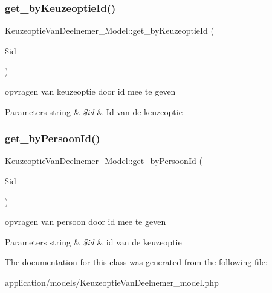 \subsubsection{\texorpdfstring{get\+\_\+by\+Keuzeoptie\+Id()}{get\_byKeuzeoptieId()}}
{\footnotesize\ttfamily Keuzeoptie\+Van\+Deelnemer\+\_\+\+Model\+::get\+\_\+by\+Keuzeoptie\+Id (\begin{DoxyParamCaption}\item[{}]{\$id }\end{DoxyParamCaption})}

opvragen van keuzeoptie door id mee te geven 
\begin{DoxyParams}[1]{Parameters}
string & {\em \$id} & Id van de keuzeoptie \\
\hline
\end{DoxyParams}
\mbox{\label{class_keuzeoptie_van_deelnemer___model_a24cf82d6b80c9d3429c1ad3d0b062cf3}} 
\subsubsection{\texorpdfstring{get\+\_\+by\+Persoon\+Id()}{get\_byPersoonId()}}
{\footnotesize\ttfamily Keuzeoptie\+Van\+Deelnemer\+\_\+\+Model\+::get\+\_\+by\+Persoon\+Id (\begin{DoxyParamCaption}\item[{}]{\$id }\end{DoxyParamCaption})}

opvragen van persoon door id mee te geven 
\begin{DoxyParams}[1]{Parameters}
string & {\em \$id} & id van de keuzeoptie \\
\hline
\end{DoxyParams}


The documentation for this class was generated from the following file\+:\begin{DoxyCompactItemize}
\item 
application/models/Keuzeoptie\+Van\+Deelnemer\+\_\+model.\+php\end{DoxyCompactItemize}
